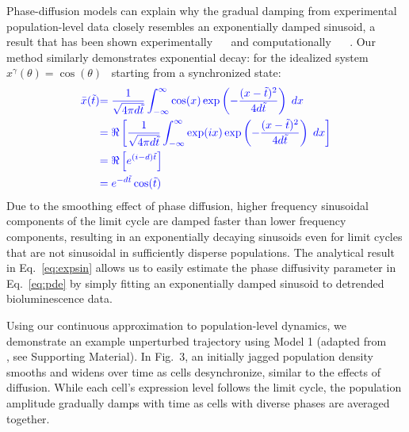 \documentclass[11pt, letterpaper]{article}
\providecommand{\DIFadd}[1]{{\protect\color{blue}#1}} %
\providecommand{\DIFdel}[1]{{\protect\color{red}}}                      %
\providecommand{\DIFaddbegin}{} %
\providecommand{\DIFaddend}{} %
\providecommand{\DIFdelbegin}{} %
\providecommand{\DIFdelend}{} %
\begin{document}
\DIFadd{Phase-diffusion models can explain why the gradual damping from experimental }\DIFaddend population-level \DIFdelbegin \DIFdel{trajectory appears damped for the first cycle, until the oscillators return to the limit cycle and normal amplitudes are restored. In
Fig. 4C the perturbation reduces the population synchrony while increasing
single-cell amplitudes, yielding amplitudes that are transiently increased
before the population settles to a lower-amplitude, desynchronized trajectory.
These features allow us to distinguish between these two sources of amplitude
change without explicitly recording single-cell amplitudes: amplitude change
induced at the }\DIFdelend \DIFaddbegin \DIFadd{data closely resembles an exponentially damped sinusoid, a result that has been shown experimentally \mbox{%
\cite{Welsh2004}
}%
and computationally \mbox{%
\cite{Rougemont2007}
}%
.
Our method similarly demonstrates exponential decay: for the idealized system \mbox{%
$x^\gamma(\theta) = \cos(\theta)$
}%
starting from a synchronized state:
}\begin{align}\DIFadd{
  \bar{x}(\tilde{t}) }&\DIFadd{= \frac{1}{\sqrt{4\pi d\tilde{t}}}\int_{-\infty}^{\infty}
  \cos(x) \exp\left(-\frac{(x - \tilde{t})^2}{4d\tilde{t}}\right)\; dx }\\
  &\DIFadd{= \Re\left[\frac{1}{\sqrt{4\pi d\tilde{t}}}\int_{-\infty}^{\infty}
    \exp(ix) \exp\left(-\frac{(x - \tilde{t})^2}{4d\tilde{t}}\right)\; dx\right] }\\
    &\DIFadd{= \Re\left[e^{(i - d)\tilde{t}}\right]}\\
    &\DIFadd{= e^{-d\tilde{t}} \cos(\tilde{t}) \label{eq:expsin}
}\end{align}
\DIFadd{Due to the smoothing effect of phase diffusion, higher frequency sinusoidal components of the limit cycle are damped faster than lower frequency components, resulting in an exponentially decaying sinusoids even for limit cycles that are not sinusoidal in sufficiently disperse populations.
The analytical result in Eq.~\ref{eq:expsin} allows us to easily estimate the phase diffusivity parameter in Eq.~\ref{eq:pde} by simply fitting an exponentially damped sinusoid to detrended bioluminescence data.
}


\DIFadd{Using our continuous approximation to }\DIFaddend population-level \DIFdelbegin \DIFdel{will follow a consistent decaying sinusoid ,
while a change induced at the single-cell level will deviate from this
exponential decay.
Additionally, these results underscore the importance in
considering both single-cell and population-mediated amplitude change in
predicting }\DIFdelend \DIFaddbegin \DIFadd{dynamics, we demonstrate an example unperturbed trajectory using Model 1 (adapted from \mbox{%
\cite{Novak2008}
}%
, see Supporting Material).
In Fig.~3, an initially jagged population density smooths and widens over time as cells desynchronize, similar to }\DIFaddend the effects of \DIFdelbegin \DIFdel{daily stimuli on clock amplitudes}\DIFdelend \DIFaddbegin \DIFadd{diffusion.
While each cell's expression level follows the limit cycle, the population amplitude gradually damps with time as cells with diverse phases are averaged together}\DIFaddend .
\end{document}
